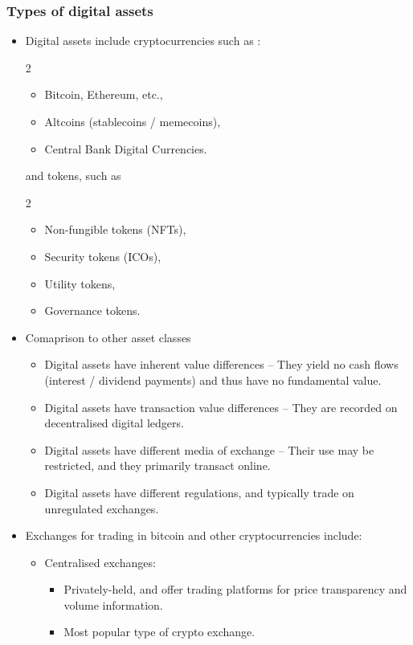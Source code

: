 \documentclass[../notes_compiled.tex]{subfiles}
\begin{document}
\subsubsection{Types of digital assets}
\begin{itemize}
\item Digital assets include cryptocurrencies such as :
\begin{multicols}{2}
\begin{itemize}
\item Bitcoin, Ethereum, etc.,
\item Altcoins (stablecoins / memecoins),
\item Central Bank Digital Currencies.
\end{itemize}
\end{multicols}
and tokens, such as
\begin{multicols}{2}
\begin{itemize}
\item Non-fungible tokens (NFTs),
\item Security tokens (ICOs),
\item Utility tokens,
\item Governance tokens.
\end{itemize}
\end{multicols}
\item Comaprison to other asset classes
\begin{itemize}
\item Digital assets have inherent value differences -- They yield no cash flows (interest / dividend payments) and thus have no fundamental value.
\item Digital assets have transaction value differences -- They are recorded on decentralised digital ledgers.
\item Digital assets have different media of exchange -- Their use may be restricted, and they primarily transact online.
\item Digital assets have different regulations, and typically trade on unregulated exchanges.
\end{itemize}
\item Exchanges for trading in bitcoin and other cryptocurrencies include:
\begin{itemize}
\item Centralised exchanges:
\begin{itemize}
\item Privately-held, and offer trading platforms for price transparency and volume information.
\item Most popular type of crypto exchange.

\end{itemize}
\end{itemize}
\end{itemize}
\end{document}
